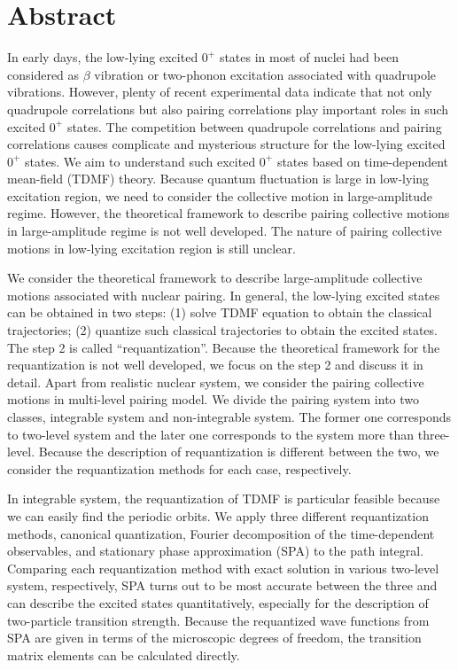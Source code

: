 \documentclass[11pt]{book} %
\begin{document}
\chapter*{Abstract}
\thispagestyle{empty}

In early days, the low-lying excited $0^+$ states in most of nuclei had been considered as $\beta$ vibration or two-phonon excitation associated with quadrupole vibrations. However, plenty of recent experimental data indicate that not only quadrupole correlations but also pairing correlations play important roles in such excited $0^+$ states. 
The competition between quadrupole correlations and pairing correlations causes complicate and mysterious structure for the low-lying excited $0^+$ states. 
We aim to understand such excited $0^+$ states based on time-dependent mean-field (TDMF) theory. Because quantum fluctuation is large in low-lying excitation region, we need to consider the collective motion in large-amplitude regime. However, the theoretical framework to describe pairing collective motions in large-amplitude regime is not well developed. The nature of pairing collective motions in low-lying excitation region is still unclear.

We consider the theoretical framework to describe large-amplitude collective motions associated with nuclear pairing. In general, the low-lying excited states can be obtained in two steps: (1) solve TDMF equation to obtain the classical trajectories; (2) quantize such classical trajectories to obtain the excited states. The step 2 is called ``requantization''. Because the theoretical framework for the requantization is not well developed, we focus on the step 2 and discuss it in detail. 
Apart from realistic nuclear system, 
we consider the pairing collective motions in multi-level pairing model. We divide the pairing system into two classes, integrable system and non-integrable system. The former one corresponds to two-level system and the later one corresponds to the system more than three-level. Because the description of requantization is different between the two, we consider the requantization methods for each case, respectively.

In integrable system, the requantization of TDMF is particular feasible because we can easily find the periodic orbits. We apply three different requantization methods, canonical quantization, Fourier decomposition of the time-dependent observables, and stationary phase approximation (SPA) to the path integral. Comparing each requantization method with exact solution in various two-level system, respectively, SPA turns out to be most accurate between the three and can describe the excited states quantitatively, especially for the description of two-particle transition strength. Because the requantized wave functions from SPA are given in terms of the microscopic degrees of freedom, the transition matrix elements can be calculated directly.
\end{document}
